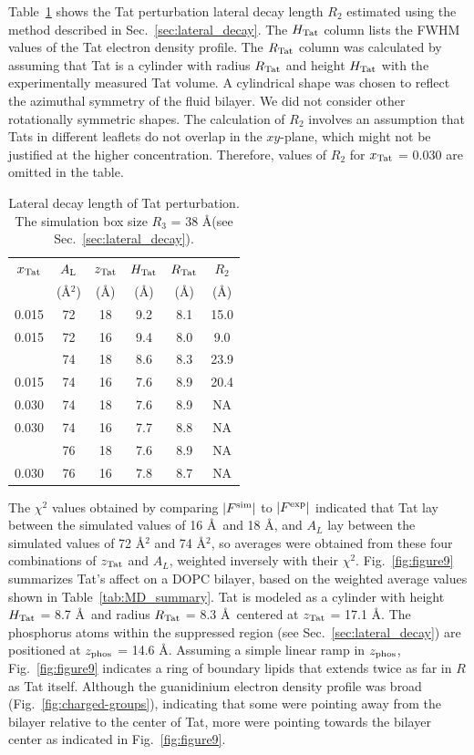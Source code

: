 Table~\ref{tab:lateral_decay} shows the Tat perturbation lateral decay length 
$R_2$ estimated using the method described in Sec.~\ref{sec:lateral_decay}.
The $H_\textrm{Tat}$ column lists the FWHM values of the Tat electron density profile.
The $R_\textrm{Tat}$ column was calculated by assuming that Tat is a cylinder with
radius $R_\textrm{Tat}$ and height $H_\textrm{Tat}$ with the experimentally 
measured Tat volume. 
A cylindrical shape was chosen to reflect the azimuthal symmetry
of the fluid bilayer. We did not consider other rotationally symmetric shapes.
The calculation of $R_2$ involves an assumption that Tats in different leaflets
do not overlap in the $xy$-plane, which might not be justified at the higher 
concentration. Therefore, values of $R_2$ for $x_\textrm{Tat}$ = 0.030 are omitted in the table.

\begin{table}[htbp]
  \centering
  \begin{tabular}{cccccc}
    \hline
    $x_\textrm{Tat}$ & $A_\textrm{L}$ & $z_\textrm{Tat}$ & $H_\textrm{Tat}$ & $R_\textrm{Tat}$ & $R_2$ \\
     & (\AA$^2$) & (\AA) & (\AA) & (\AA) & (\AA) \\
    \hline
    0.015 & 72 & 18 & 9.2 & 8.1 & 15.0 \\  
    0.015 & 72 & 16 & 9.4 & 8.0 & 9.0  \\
    \hdashline
    0.015 & 74 & 18 & 8.6 & 8.3 & 23.9 \\
    0.015 & 74 & 16 & 7.6 & 8.9 & 20.4 \\
    \hline
    0.030 & 74 & 18 & 7.6 & 8.9 & NA  \\
    0.030 & 74 & 16 & 7.7 & 8.8 & NA  \\
    \hdashline
    0.030 & 76 & 18 & 7.6 & 8.9 & NA  \\
    0.030 & 76 & 16 & 7.8 & 8.7 & NA  \\
    \hline
  \end{tabular}
  \caption{Lateral decay length of Tat perturbation. 
  The simulation box size $R_3$ = 38 \AA (see Sec.~\ref{sec:lateral_decay}).}
  \label{tab:lateral_decay}
\end{table}

The $\chi^2$ values obtained by comparing $|F^\text{sim}|$ to $|F^\text{exp}|$ 
indicated that
Tat lay between the simulated values of 16 \AA\ and 18 \AA, and
$A_L$ lay between the simulated values of 72 \AA$^2$ and 
74 \AA$^2$, so averages were obtained from these four combinations of $z_\textrm{Tat}$ and 
$A_L$, weighted inversely with their $\chi^2$.
Fig.~\ref{fig:figure9} summarizes Tat's affect on a DOPC bilayer,
based on the weighted average values shown in Table~\ref{tab:MD_summary}.
Tat is modeled as a cylinder with height $H_\textrm{Tat}$ = 8.7 \AA\ 
and radius $R_\textrm{Tat}$ = 8.3 \AA\ centered at $z_\textrm{Tat}$ = 17.1 \AA.
The phosphorus atoms within the suppressed region (see Sec.~\ref{sec:lateral_decay}) 
are positioned at $z_\textrm{phos}$ = 14.6 \AA.
Assuming a simple linear ramp in $z_\textrm{phos}$, Fig.~\ref{fig:figure9} 
indicates a ring of boundary lipids that extends twice as far in $R$ as Tat 
itself. Although the guanidinium electron density profile was broad 
(Fig.~\ref{fig:charged-groups}), indicating that some were pointing 
away from the bilayer relative to the center of Tat, 
more were pointing towards the bilayer center as 
indicated in Fig.~\ref{fig:figure9}.

